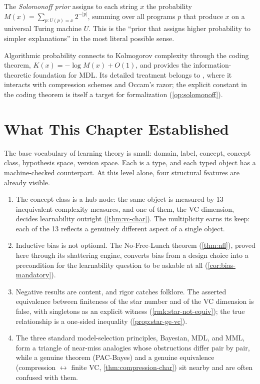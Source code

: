 \begin{defn}
\label{def:alg-prob}
The \emph{Solomonoff prior} assigns to each string $x$ the probability $M(x) = \sum_{p : U(p)=x} 2^{-|p|}$, summing over all programs $p$ that produce $x$ on a universal Turing machine $U$. This is the ``prior that assigns higher probability to simpler explanations'' in the most literal possible sense.
\end{defn}

Algorithmic probability connects to Kolmogorov complexity through the coding theorem, $K(x) = -\log M(x) + O(1)$, and provides the information-theoretic foundation for MDL. Its detailed treatment belongs to , where it interacts with compression schemes and Occam's razor; the explicit constant in the coding theorem is itself a target for formalization (\cref{op:solomonoff}).

\section{What This Chapter Established}
\label{sec:ch1-summary}

The base vocabulary of learning theory is small: domain, label, concept, concept class, hypothesis space, version space. Each is a type, and each typed object has a machine-checked counterpart. At this level alone, four structural features are already visible.

\begin{enumerate}[leftmargin=*,itemsep=3pt]
\item The concept class is a hub node: the same object is measured by 13 inequivalent complexity measures, and one of them, the VC dimension, decides learnability outright (\cref{thm:vc-char}). The multiplicity earns its keep: each of the 13 reflects a genuinely different aspect of a single object.

\item Inductive bias is not optional. The No-Free-Lunch theorem (\cref{thm:nfl}), proved here through its shattering engine, converts bias from a design choice into a precondition for the learnability question to be askable at all (\cref{cor:bias-mandatory}).

\item Negative results are content, and rigor catches folklore. The asserted equivalence between finiteness of the star number and of the VC dimension is false, with singletons as an explicit witness (\cref{rmk:star-not-equiv}); the true relationship is a one-sided inequality (\cref{prop:star-ge-vc}).

\item The three standard model-selection principles, Bayesian, MDL, and MML, form a triangle of near-miss analogies whose obstructions differ pair by pair, while a genuine theorem (PAC-Bayes) and a genuine equivalence (compression $\leftrightarrow$ finite VC, \cref{thm:compression-char}) sit nearby and are often confused with them.
\end{enumerate}

